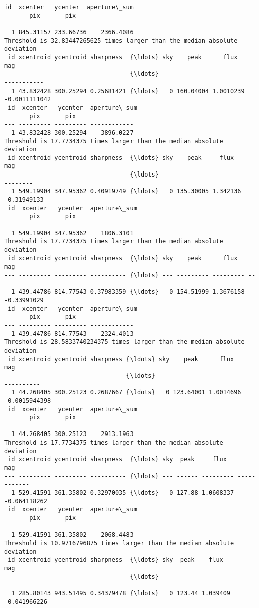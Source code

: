 \documentclass[11pt]{article}
\begin{document}
\begin{Verbatim}[commandchars=\\\{\}]
 id  xcenter   ycenter  aperture\_sum
       pix       pix
--- --------- --------- ------------
  1 845.31157 233.66736    2366.4086
Threshold is 32.83447265625 times larger than the median absolute deviation
 id xcentroid ycentroid sharpness  {\ldots} sky    peak      flux        mag
--- --------- --------- ---------- {\ldots} --- --------- --------- -------------
  1 43.832428 300.25294 0.25681421 {\ldots}   0 160.04004 1.0010239 -0.0011111042
 id  xcenter   ycenter  aperture\_sum
       pix       pix
--- --------- --------- ------------
  1 43.832428 300.25294    3896.0227
Threshold is 17.7734375 times larger than the median absolute deviation
 id xcentroid ycentroid sharpness  {\ldots} sky    peak     flux       mag
--- --------- --------- ---------- {\ldots} --- --------- -------- -----------
  1 549.19904 347.95362 0.40919749 {\ldots}   0 135.30005 1.342136 -0.31949133
 id  xcenter   ycenter  aperture\_sum
       pix       pix
--- --------- --------- ------------
  1 549.19904 347.95362    1806.3101
Threshold is 17.7734375 times larger than the median absolute deviation
 id xcentroid ycentroid sharpness  {\ldots} sky    peak      flux       mag
--- --------- --------- ---------- {\ldots} --- --------- --------- -----------
  1 439.44786 814.77543 0.37983359 {\ldots}   0 154.51999 1.3676158 -0.33991029
 id  xcenter   ycenter  aperture\_sum
       pix       pix
--- --------- --------- ------------
  1 439.44786 814.77543    2324.4013
Threshold is 28.5833740234375 times larger than the median absolute deviation
 id xcentroid ycentroid sharpness {\ldots} sky    peak      flux        mag
--- --------- --------- --------- {\ldots} --- --------- --------- -------------
  1 44.268405 300.25123 0.2687667 {\ldots}   0 123.64001 1.0014696 -0.0015944398
 id  xcenter   ycenter  aperture\_sum
       pix       pix
--- --------- --------- ------------
  1 44.268405 300.25123    2913.1963
Threshold is 17.7734375 times larger than the median absolute deviation
 id xcentroid ycentroid sharpness  {\ldots} sky  peak     flux       mag
--- --------- --------- ---------- {\ldots} --- ------ --------- ------------
  1 529.41591 361.35802 0.32970035 {\ldots}   0 127.88 1.0608337 -0.064118262
 id  xcenter   ycenter  aperture\_sum
       pix       pix
--- --------- --------- ------------
  1 529.41591 361.35802    2068.4483
Threshold is 10.9716796875 times larger than the median absolute deviation
 id xcentroid ycentroid sharpness  {\ldots} sky  peak    flux       mag
--- --------- --------- ---------- {\ldots} --- ------ -------- ------------
  1 285.80143 943.51495 0.34379478 {\ldots}   0 123.44 1.039409 -0.041966226

\end{Verbatim}
\end{document}
